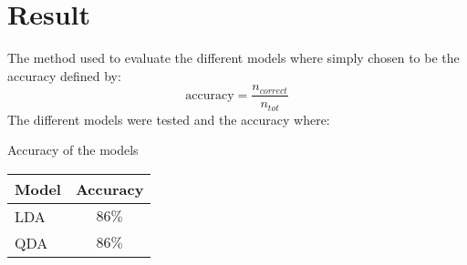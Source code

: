 \section{Result}

The method used to evaluate the different models where simply chosen to be the accuracy defined by:
\begin{equation*}
    \text{accuracy} = \frac{n_{correct}}{n_{tot}}
\end{equation*}
The different models were tested and the accuracy where:
\\
\begin{table*}[h]
    \begin{center}
        Accuracy of the models
        \\
        \begin{tabular}{|l|c|}
            \hline
            Model & Accuracy \\
            \hline
            LDA & $86\%$ \\
            QDA & $86\%$ \\
            \hline
        \end{tabular}
    \end{center}
\end{table*}
